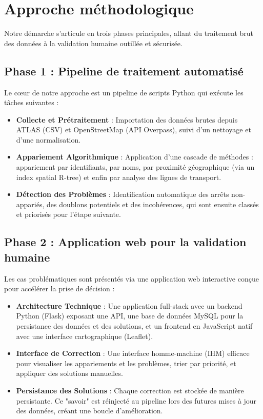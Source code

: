 \section*{Approche méthodologique}

Notre démarche s'articule en trois phases principales, allant du traitement brut des données à la validation humaine outillée et sécurisée.

\subsection*{Phase 1 : Pipeline de traitement automatisé}
Le cœur de notre approche est un pipeline de scripts Python qui exécute les tâches suivantes :
\begin{itemize}
    \item \textbf{Collecte et Prétraitement} : Importation des données brutes depuis ATLAS (CSV) et OpenStreetMap (API Overpass), suivi d'un nettoyage et d'une normalisation.
    \item \textbf{Appariement Algorithmique} : Application d'une cascade de méthodes : appariement par identifiants, par noms, par proximité géographique (via un index spatial R-tree) et enfin par analyse des lignes de transport.
    \item \textbf{Détection des Problèmes} : Identification automatique des arrêts non-appariés, des doublons potentiels et des incohérences, qui sont ensuite classés et priorisés pour l'étape suivante.
\end{itemize}

\subsection*{Phase 2 : Application web pour la validation humaine}
Les cas problématiques sont présentés via une application web interactive conçue pour accélérer la prise de décision :
\begin{itemize}
    \item \textbf{Architecture Technique} : Une application full-stack avec un backend Python (Flask) exposant une API, une base de données MySQL pour la persistance des données et des solutions, et un frontend en JavaScript natif avec une interface cartographique (Leaflet).
    \item \textbf{Interface de Correction} : Une interface homme-machine (IHM) efficace pour visualiser les appariements et les problèmes, trier par priorité, et appliquer des solutions manuelles.
    \item \textbf{Persistance des Solutions} : Chaque correction est stockée de manière persistante. Ce "savoir" est réinjecté au pipeline lors des futures mises à jour des données, créant une boucle d'amélioration.
\end{itemize}

